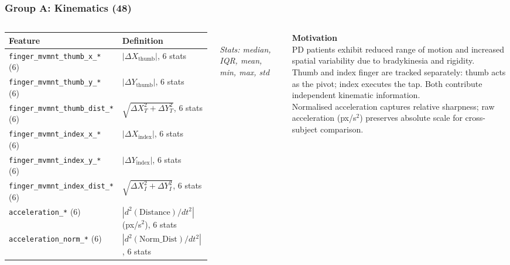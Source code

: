 \documentclass[aspectratio=169]{beamer}
\begin{document}
\begin{frame}
    \frametitle{Group A: Kinematics (48)}
    \scriptsize
    \begin{columns}[T]
        \renewcommand{\arraystretch}{1.2}
        \begin{tabular}{p{4.2cm}p{2.8cm}}
            \toprule
            \textbf{Feature} & \textbf{Definition} \\
            \midrule
            \texttt{finger\_mvmnt\_thumb\_x\_*} (6) & $|\Delta X_\text{thumb}|$, 6 stats \\
            \texttt{finger\_mvmnt\_thumb\_y\_*} (6) & $|\Delta Y_\text{thumb}|$, 6 stats \\
            \texttt{finger\_mvmnt\_thumb\_dist\_*} (6) & $\sqrt{\Delta X_T^2+\Delta Y_T^2}$, 6 stats \\
            \texttt{finger\_mvmnt\_index\_x\_*} (6) & $|\Delta X_\text{index}|$, 6 stats \\
            \texttt{finger\_mvmnt\_index\_y\_*} (6) & $|\Delta Y_\text{index}|$, 6 stats \\
            \texttt{finger\_mvmnt\_index\_dist\_*} (6) & $\sqrt{\Delta X_I^2+\Delta Y_I^2}$, 6 stats \\
            \texttt{acceleration\_*} (6) & $|d^2(\text{Distance})/dt^2|$ (px/s$^2$), 6 stats \\
            \texttt{acceleration\_norm\_*} (6) & $|d^2(\text{Norm\_Dist})/dt^2|$, 6 stats \\
            \bottomrule
        \end{tabular}\\[0.3em]
        \emph{Stats: median, IQR, mean, min, max, std}

        \textbf{Motivation}\\[0.3em]
        PD patients exhibit reduced range of motion and increased spatial variability due to bradykinesia and rigidity.\\[0.4em]
        Thumb and index finger are tracked separately: thumb acts as the pivot; index executes the tap. Both contribute independent kinematic information.\\[0.4em]
        Normalised acceleration captures relative sharpness; raw acceleration (px/s$^2$) preserves absolute scale for cross-subject comparison.
    \end{columns}
\end{frame}
\end{document}
